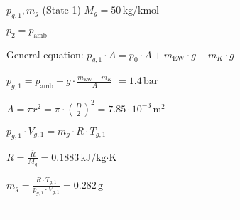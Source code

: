 \( p_{g,1}, m_g \) (State 1)  
\( M_g = 50 \, \text{kg/kmol} \)  

\( p_2 = p_{\text{amb}} \)  

General equation:  
\( p_{g,1} \cdot A = p_{\text{0}} \cdot A + m_{\text{EW}} \cdot g + m_K \cdot g \)  

\( p_{g,1} = p_{\text{amb}} + g \cdot \frac{m_{\text{EW}} + m_K}{A} \)  
\( = 1.4 \, \text{bar} \)  

\( A = \pi r^2 = \pi \cdot \left(\frac{D}{2}\right)^2 = 7.85 \cdot 10^{-3} \, \text{m}^2 \)  

\( p_{g,1} \cdot V_{g,1} = m_g \cdot R \cdot T_{g,1} \)  

\( R = \frac{\overline{R}}{M_g} = 0.1883 \, \text{kJ/kg·K} \)  

\( m_g = \frac{R \cdot T_{g,1}}{p_{g,1} \cdot V_{g,1}} = 0.282 \, \text{g} \)  

---